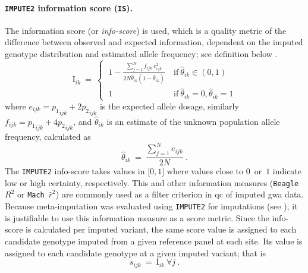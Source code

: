 \paragraph{\texttt{IMPUTE2} information score (\texttt{IS}).}
The information score (or \emph{info-score}) is used, which is a quality metric of the difference between observed and expected information, dependent on the imputed genotype distribution and estimated allele frequency; see definition below \citep[][S3, eq.~16; modified here to correspond to present notation]{Marchini:2010cga}.
\begin{equation}
	\text{I}_{ik} ~=~
	\begin{cases}
    ~ 1 - \frac{\sum_{j=1}^{N} f_{ijk} ~ e_{ijk}^2}{2N \hat{\theta}_{ik} (1 - \hat{\theta}_{ik})} &
		~ \text{if} ~
		\hat{\theta}_{ik} \in (0,1) \\
    ~ 1 & ~ \text{if} ~ \hat{\theta}_{ik} = 0, \hat{\theta}_{ik} = 1
  \end{cases}
\end{equation}
where ${e_{ijk} = {p_{1}}_{ijk} + 2 {p_{2}}_{ijk}}$ is the expected allele dosage, similarly ${f_{ijk} = {p_{1}}_{ijk} + 4 {p_{2}}_{ijk}}$, and $\hat{\theta}_{ik}$ is an estimate of the unknown population allele frequency, calculated as
\begin{equation}
	\hat{\theta}_{ik} ~=~ \frac{\sum_{j=1}^{N} e_{ijk}}{2N}\ .
\end{equation}
The \texttt{IMPUTE2} info-score takes values in $\lbrack 0,1 \rbrack$ where values close to $0$~or~$1$ indicate low or high certainty, respectively.
This and other information measures (\eg \texttt{Beagle}~$R^{2}$ or \texttt{Mach}~$\hat r^{2}$) are commonly used as a filter criterion in \gls{qc} of imputed \gls{gwa} data.
Because meta-imputation was evaluated using \texttt{IMPUTE2} for imputations (see ), it is justifiable to use this information measure as a score metric.
Since the info-score is calculated per imputed variant, the same score value is assigned to each candidate genotype imputed from a given reference panel at each site.
Its value is assigned to each candidate genotype at a given imputed variant; that is
\begin{equation}
	s_{ijk} ~=~ \text{I}_{ik} ~\forall j \ .
\end{equation}

